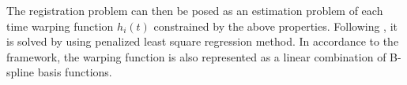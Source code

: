 The registration problem can then be posed as an estimation problem of each time warping function $h_i(t)$ constrained by the above properties.
Following \cite{Ramsay1998}, it is solved by using penalized least square regression method.
In accordance to the  framework, the warping function is also represented as a linear combination of B-spline basis functions.